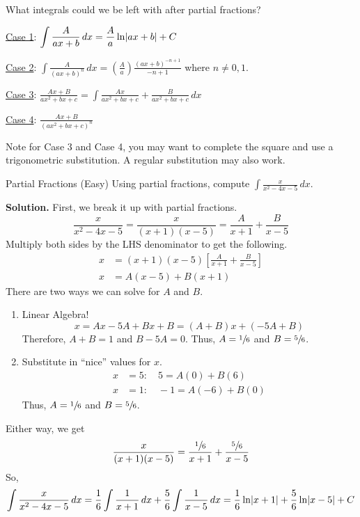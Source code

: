\begin{Remark}{What integrals could we be left with after partial fractions?}{}

    \underline{Case 1}: $ \displaystyle \int \frac{A}{ax+b} \, d{x} =\frac{A}{a}\ln\lvert ax+b\rvert+C $

    \underline{Case 2}: $ \displaystyle \int \frac{A}{(ax+b)^n} \, d{x} =\left( \frac{A}{a} \right) \frac{(ax+b)^{-n+1}}{-n+1} $
    where $ n\neq 0,1 $.

    \underline{Case 3}: $ \displaystyle \frac{Ax+B}{ax^2+bx+c} =\int \frac{Ax}{ax^2+bx+c} +\frac{B}{ax^2+bx+c} \, d{x}  $

    \underline{Case 4}: $ \displaystyle \frac{Ax+B}{\left( ax^2+bx+c \right)^n} $

    Note for Case 3 and Case 4, you may want to complete the square and use a trigonometric
    substitution. A regular substitution may also work.
\end{Remark}

\begin{Example}{Partial Fractions (Easy)}{}
    Using partial fractions, compute
    $ \displaystyle \int \frac{x}{x^2-4x-5} \, d{x} $.

    \textbf{Solution.}
    First, we break it up with partial fractions.
    \[ \frac{x}{x^2-4x-5} =\frac{x}{(x+1)(x-5)}=\frac{A}{x+1} +\frac{B}{x-5} \]
    Multiply both sides by the LHS denominator to get the following.
    \begin{align*}
        x & =(x+1)(x-5)\left[ \frac{A}{x+1} +\frac{B}{x-5}  \right] \\
        x & =A(x-5)+B(x+1)
    \end{align*}
    There are two ways we can solve for $ A $ and $ B $.
    \begin{enumerate}[label=(\roman*)]
        \item Linear Algebra!
              \[ x=Ax-5A+Bx+B=(A+B)x+(-5A+B) \]
              Therefore, $ A+B = 1 $ and $ B-5A=0 $. Thus, $ A=\sfrac{1}{6} $
              and $ B=\sfrac{5}{6} $.
        \item Substitute in ``nice'' values for $ x $.
              \begin{align*}
                  x & =5\colon \quad 5   =A(0)+B(6)  \\
                  x & =1\colon \quad -1  =A(-6)+B(0)
              \end{align*}
              Thus, $ A=\sfrac{1}{6} $ and $ B=\sfrac{5}{6} $.
    \end{enumerate}
    Either way, we get
    \[ \frac{x}{(x+1)(x-5)}=\frac{\sfrac{1}{6}}{x+1}+\frac{\sfrac{5}{6}}{x-5}  \]
    So,
    \[
        \int \frac{x}{x^2-4x-5}\, d{x}
        =\frac{1}{6} \int \frac{1}{x+1}\, d{x} +\frac{5}{6} \int \frac{1}{x-5} \, d{x}
        =\frac{1}{6} \ln\lvert x+1\rvert+\frac{5}{6} \ln\lvert x-5\rvert+C
    \]
\end{Example}

